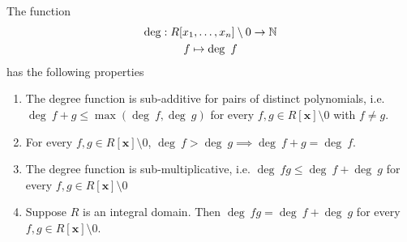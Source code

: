 \begin{lemma}\label{PropertiesOfDegreeFunction}
     The function 
    \begin{gather*}
        \deg : R[x_1,\dots,x_n]\setminus 0 \rightarrow \mathbb{N}\\
        f\mapsto \deg \ f
    \end{gather*}
    has the following properties 
    \begin{enumerate}
        \item The degree function is sub-additive for pairs of distinct polynomials, i.e. $\deg \ f + g \leq \max(\deg\ f, \deg \ g)$ for every $f,g\in R[\mathbf{x}]\setminus 0$ with $f\neq g$.
        \item For every $f,g\in R[\mathbf{x}]\setminus 0$, $\deg \ f >\deg \ g\implies \deg \ f+g = \deg \ f$.
        \item The degree function is sub-multiplicative, i.e. $\deg \ fg \leq \deg \ f+ \deg \ g$ for every $f,g\in R[\mathbf{x}]\setminus 0$
        \item Suppose $R$ is an integral domain. Then $\deg \ fg = \deg \ f+ \deg \ g$ for every $f,g\in R[\mathbf{x}]\setminus 0$.
    \end{enumerate}
\end{lemma}

